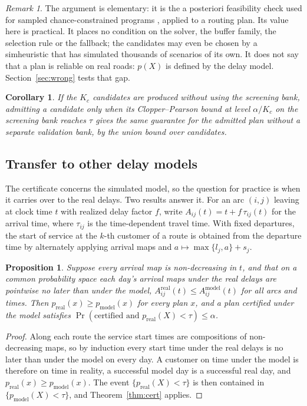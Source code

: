 \documentclass[11pt,a4paper]{article}
\newtheorem{corollary}{Corollary}
\newtheorem{proposition}{Proposition}
\theoremstyle{remark}
\newtheorem{remark}{Remark}
\begin{document}
\begin{remark}
The argument is elementary: it is the a posteriori feasibility check used for sampled
chance-constrained programs \citep{luedtke2008}, applied to a routing plan. Its
value here is practical. It places no condition on the solver, the buffer family, the selection
rule or the fallback; the candidates may even be chosen by a simheuristic that has
simulated thousands of scenarios of its own. It does not say that a plan is
reliable on real roads: $p(X)$ is defined by the delay model. Section~\ref{sec:wrong}
tests that gap.
\end{remark}

\begin{corollary}\label{cor:bonf}
If the $K_c$ candidates are produced without using the screening bank, admitting a
candidate only when its Clopper--Pearson bound at level $\alpha/K_c$ on the
screening bank reaches $\tau$ gives the same guarantee for the admitted plan
without a separate validation bank, by the union bound over candidates.
\end{corollary}

\subsection{Transfer to other delay models}\label{sec:transfer}

The certificate concerns the simulated model, so the question for practice is when
it carries over to the real delays. Two results answer it. For an arc $(i,j)$
leaving at clock time $t$ with realized delay factor $f$, write
$A_{ij}(t)=t+f\,\tau_{ij}(t)$ for the arrival time, where $\tau_{ij}$ is the
time-dependent travel time. With fixed departures, the start of service at the
$k$-th customer of a route is obtained from the departure time by alternately
applying arrival maps and $a\mapsto\max\{l_j,a\}+s_j$.

\begin{proposition}\label{prop:transfer}
Suppose every arrival map is non-decreasing in $t$, and that on a common
probability space each day's arrival maps under the real delays are pointwise no
later than under the model, $A^{\mathrm{real}}_{ij}(t)\le A^{\mathrm{model}}_{ij}(t)$ for
all arcs and times. Then $p_{\mathrm{real}}(x)\ge p_{\mathrm{model}}(x)$ for every plan
$x$, and a plan certified under the model satisfies
$\Pr(\text{certified and }p_{\mathrm{real}}(X)<\tau)\le\alpha$.
\end{proposition}

\begin{proof}
Along each route the service start times are compositions of non-decreasing maps,
so by induction every start time under the real delays is no later than under the
model on every day. A customer on time under the model is therefore on time in
reality, a successful model day is a successful real day, and
$p_{\mathrm{real}}(x)\ge p_{\mathrm{model}}(x)$. The event
$\{p_{\mathrm{real}}(X)<\tau\}$ is then contained in $\{p_{\mathrm{model}}(X)<\tau\}$, and
Theorem~\ref{thm:cert} applies.
\end{proof}
\end{document}
